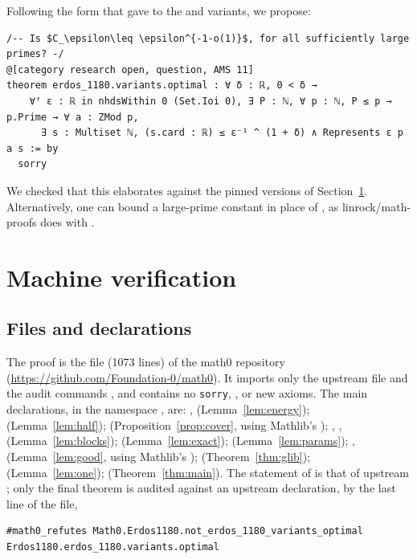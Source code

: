 \documentclass[11pt]{amsart}
\theoremstyle{plain}
\theoremstyle{definition}
\begin{document}
{Following the form that \cite{PR6486} gave to the  and  variants, we propose:
\begin{lstlisting}
/-- Is $C_\epsilon\leq \epsilon^{-1-o(1)}$, for all sufficiently large primes? -/
@[category research open, question, AMS 11]
theorem erdos_1180.variants.optimal : ∀ δ : ℝ, 0 < δ →
    ∀ᶠ ε : ℝ in nhdsWithin 0 (Set.Ioi 0), ∃ P : ℕ, ∀ p : ℕ, P ≤ p → p.Prime → ∀ a : ZMod p,
      ∃ s : Multiset ℕ, (s.card : ℝ) ≤ ε⁻¹ ^ (1 + δ) ∧ Represents ε p a s := by
  sorry
\end{lstlisting}
We checked that this elaborates against the pinned versions of Section~\ref{sec:lean}. Alternatively, one can bound a large-prime constant in place of , as linrock/math-proofs does with  \cite{linrock}.

\section{Machine verification}\label{sec:lean}

\subsection*{Files and declarations}
{\raggedright The proof is the file  (1073 lines) of the math0 repository (\url{https://github.com/Foundation-0/math0}). It imports only the upstream file  and the audit commands , and contains no \texttt{sorry}, ,  or new axioms. The main declarations, in the namespace , are:
,  (Lemma~\ref{lem:energy});
 (Lemma~\ref{lem:half});
 (Proposition~\ref{prop:cover}, using Mathlib's );
, ,  (Lemma~\ref{lem:blocks});
 (Lemma~\ref{lem:exact});
 (Lemma~\ref{lem:params});
,  (Lemma~\ref{lem:good}, using Mathlib's );
 (Theorem~\ref{thm:glib});
 (Lemma~\ref{lem:one});
 (Theorem~\ref{thm:main}).
The statement of  is that of upstream ; only the final theorem is audited against an upstream declaration, by the last line of the file,\par}
\begin{lstlisting}[basicstyle=\ttfamily\scriptsize]
#math0_refutes Math0.Erdos1180.not_erdos_1180_variants_optimal Erdos1180.erdos_1180.variants.optimal
\end{lstlisting}

}
\end{document}
